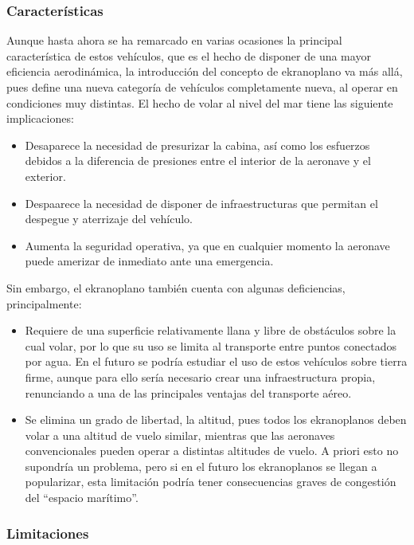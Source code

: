 \subsubsection{Características}
\label{sec:wig:ekranoplane:characteristics}

Aunque hasta ahora se ha remarcado en varias ocasiones la principal característica de estos vehículos, que es el hecho de disponer de una mayor eficiencia aerodinámica, la introducción del concepto de ekranoplano va más allá, pues define una nueva categoría de vehículos completamente nueva, al operar en condiciones muy distintas. El hecho de volar al nivel del mar tiene las siguiente implicaciones:
\begin{itemize}
\item Desaparece la necesidad de presurizar la cabina, así como los esfuerzos debidos a la diferencia de presiones entre el interior de la aeronave y el exterior.
\item Despaarece la necesidad de disponer de infraestructuras que permitan el despegue y aterrizaje del vehículo.
\item Aumenta la seguridad operativa, ya que en cualquier momento la aeronave puede amerizar de inmediato ante una emergencia.
\end{itemize}

Sin embargo, el ekranoplano también cuenta con algunas deficiencias, principalmente:
\begin{itemize}
\item Requiere de una superficie relativamente llana y libre de obstáculos sobre la cual volar, por lo que su uso se limita al transporte entre puntos conectados por agua. En el futuro se podría estudiar el uso de estos vehículos sobre tierra firme, aunque para ello sería necesario crear una infraestructura propia, renunciando a una de las principales ventajas del transporte aéreo.
\item Se elimina un grado de libertad, la altitud, pues todos los ekranoplanos deben volar a una altitud de vuelo similar, mientras que las aeronaves convencionales pueden operar a distintas altitudes de vuelo. A priori esto no supondría un problema, pero si en el futuro los ekranoplanos se llegan a popularizar, esta limitación podría tener consecuencias graves de congestión del “espacio marítimo”.
\end{itemize}


\subsubsection{Limitaciones}
\label{sec:wig:ekranoplane:limitations}

